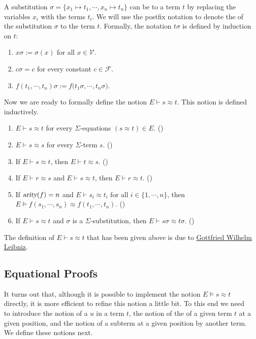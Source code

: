A substitution $\sigma = \{ x_1 \mapsto t_1, \cdots, x_n \mapsto t_n \}$ can be  to a term $t$
by replacing the variables $x_i$ with the terms $t_i$.  We will use the postfix notation  to denote the
 of the substitution $\sigma$ to the term $t$.  Formally, the notation $t \sigma$ is defined
by induction on $t$:
\begin{enumerate}
\item $x \sigma := \sigma(x)$ \quad for all $x \in \mathcal{V}$.
\item $c \sigma = c$ \quad for every constant $c \in \mathcal{F}$.
\item $f(t_1, \cdots, t_n) \sigma := f\bigl(t_1\sigma, \cdots, t_n\sigma\bigr)$.
\end{enumerate}
Now we are ready to formally define the notion $E \vdash s \approx t$.  This notion is defined inductively.
\begin{enumerate}
\item $E \vdash s \approx t$ \quad for every $\Sigma$-equations $(s \approx t) \in E$. \hspace*{\fill} ()
\item $E \vdash s \approx s$ \quad for every $\Sigma$-term $s$. \hspace*{\fill} ()
\item If $E \vdash s \approx t$, then $E \vdash t \approx s$.  \hspace*{\fill} ()
\item If $E \vdash r \approx s$ and $E \vdash s \approx t$, then $E \vdash r \approx t$.  
      \hspace*{\fill} ()
\item If $\textsl{arity}(f) = n$ and $E \vdash s_i \approx t_i$ for all $i \in \{1,\cdots,n\}$, then
      $E \models f(s_1,\cdots,s_n) \approx f(t_1,\cdots,t_n)$.
      \hspace*{\fill} ()
\item If $E \vdash s \approx t$ and $\sigma$ is a $\Sigma$-substitution, then $E \vdash s\sigma \approx t\sigma$.
      \hspace*{\fill} ()
\end{enumerate}
The definition of $E \vdash s \approx t$ that has been given above is due to 
\href{https://en.wikipedia.org/wiki/Gottfried_Wilhelm_Leibniz}{Gottfried Wilhelm Leibniz}.

\subsection{Equational Proofs}
It turns out that, although it is possible to implement the notion $E \models s \approx t$ directly, it is more
efficient to refine this notion a little bit.  To this end we need to introduce the notion of a  $u$
in a term $t$, the notion of the  of a given term $t$ at a given position, and the notion of
 a subterm at a given position by another term.  We define these notions next.

